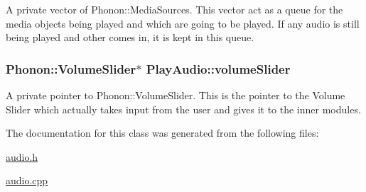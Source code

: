 \label{classPlayAudio_aa80d497cf68f1acd768f5abdb564a60a}
A private vector of Phonon::MediaSources. This vector act as a queue for the media objects being played and which are going to be played. If any audio is still being played and other comes in, it is kept in this queue. \hypertarget{classPlayAudio_a27e1f47c759326c30eca15178a3392e7}{
\subsubsection[{volumeSlider}]{\setlength{\rightskip}{0pt plus 5cm}Phonon::VolumeSlider$\ast$ {\bf PlayAudio::volumeSlider}}}
\label{classPlayAudio_a27e1f47c759326c30eca15178a3392e7}
A private pointer to Phonon::VolumeSlider. This is the pointer to the Volume Slider which actually takes input from the user and gives it to the inner modules. 

The documentation for this class was generated from the following files:\begin{DoxyCompactItemize}
\item 
\hyperlink{audio_8h}{audio.h}\item 
\hyperlink{audio_8cpp}{audio.cpp}\end{DoxyCompactItemize}
